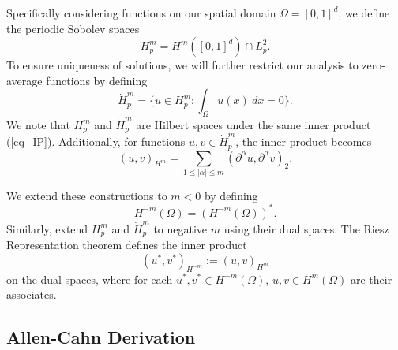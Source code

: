\documentclass[12pt, reqno]{report}
\theoremstyle{definition}
\theoremstyle{remark}
\begin{document}
Specifically considering functions on our spatial domain $\Omega=[0,1]^{d}$, we define the periodic Sobolev spaces
\begin{equation} 
    H^{m}_{p}=H^{m}([0,1]^{d})\cap L^{2}_{p}.
\end{equation}
To ensure uniqueness of solutions, we will further restrict our analysis to zero-average functions by defining
\begin{equation} 
    \dot H_{p}^{m}=\{u\in H^{m}_{p}:\int_{\Omega}u(x)~dx=0\}.
\end{equation}
We note that $H^{m}_{p}$ and $\dot H^{m}_{p}$ are Hilbert spaces under the same inner product (\ref{eq_IP}). 
Additionally, for functions $u,v\in\dot H^{m}_{p}$, the inner product becomes 
\begin{equation} 
    (u,v)_{H^{m}}=\sum_{1\le|\alpha|\le m}(\partial ^{\alpha}u,\partial ^{\alpha}v)_{2}.
\end{equation}

We extend these constructions to $m<0$ by defining 
\begin{equation} 
    H^{-m}(\Omega)=(H^{-m}(\Omega))^*.
\end{equation}
Similarly, extend $H^m_p$ and $\dot H^m_p$ to negative $m$ using their dual spaces.
The Riesz Representation theorem defines the inner product 
\begin{equation} \label{eq_IP_RRT}
    (u^{*},v^{*})_{H^{-m}}:=(u,v)_{H^m}
\end{equation}
on the dual spaces, where for each $u^{*},v^{*}\in H^{-m}(\Omega)$, $u,v\in H^{m}(\Omega)$ are their associates. 




\subsection{Allen-Cahn Derivation}
\end{document}
